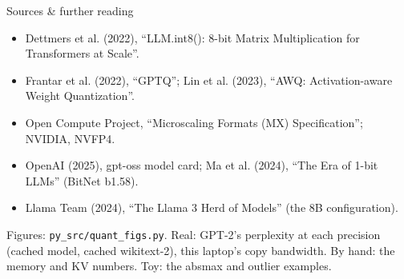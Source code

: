 \documentclass[aspectratio=169]{beamer}
\newcommand{\src}[1]{{\scriptsize\color{gray} #1}}
\begin{document}
\begin{frame}{Sources \& further reading}
  \footnotesize
  \begin{itemize}
    \item Dettmers et al. (2022), ``LLM.int8(): 8-bit Matrix Multiplication for Transformers at
      Scale''.
    \item Frantar et al. (2022), ``GPTQ''; Lin et al. (2023), ``AWQ: Activation-aware Weight
      Quantization''.
    \item Open Compute Project, ``Microscaling Formats (MX) Specification''; NVIDIA, NVFP4.
    \item OpenAI (2025), gpt-oss model card; Ma et al. (2024), ``The Era of 1-bit LLMs'' (BitNet
      b1.58).
    \item Llama Team (2024), ``The Llama 3 Herd of Models'' (the 8B configuration).
  \end{itemize}
  \vskip 2pt
  \src{Figures: \texttt{py\_src/quant\_figs.py}. Real: GPT-2's perplexity at each precision
  (cached model, cached wikitext-2), this laptop's copy bandwidth. By hand: the memory and KV
  numbers. Toy: the absmax and outlier examples.}
\end{frame}
\end{document}
